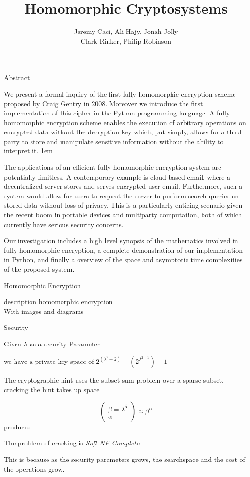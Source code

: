 \documentclass[a0,portrait]{a0poster}
\title{Homomorphic Cryptosystems}
\author{
Jeremy Caci, Ali Hajy, Jonah Jolly\\
Clark Rinker, Philip Robinson
}
\begin{document}
\maketitle



\begin{multicols}{2}
\begin{slide}{Abstract}

We present a formal inquiry of the first fully homomorphic encryption scheme proposed by Craig Gentry in 2008. Moreover we introduce the first implementation of this cipher in the Python programming language. A fully homomorphic encryption scheme enables the execution of arbitrary operations on encrypted data without the decryption key which, put simply, allows for a third party to  store and manipulate sensitive information without the ability to interpret it. 
\parskip 1em

The applications of an efficient fully homomorphic encryption system are potentially limitless. A contemporary example is cloud based email, where a decentralized server stores and serves encrypted user email. Furthermore, such a system would allow for users to request the server to perform search queries on stored data without loss of privacy. This is a particularly enticing scenario given the recent boom in portable devices and multiparty computation, both of which currently have serious security concerns. 

Our investigation includes a high level synopsis of the mathematics involved in fully homomorphic encryption, a complete demonstration of our implementation in Python, and finally a overview of the space and asymptotic time complexities of the proposed system. 

\end{slide}

\begin{slide}{Homomorphic Encryption}
 \centerline{description homomorphic encryption \\ With images and diagrams}

\end{slide}

\begin{slide}{Security}

Given \(\lambda\) as a security Parameter 

we have a private key space of \(2^{(\lambda^2-2)} - (2^{\lambda^{2-1}})-1\)

The cryptographic hint uses the subset sum problem over a sparse subset. cracking the hint takes up space 

\[\left(\begin{matrix}\beta = \lambda^5\\\alpha \end{matrix}\right)\approx \beta^\alpha\] produces


The problem of cracking is {\em Soft NP-Complete}

This is because as the security parameters grows, the searchspace and the cost of the operations grow. 
\end{slide}

\end{multicols}
\end{document}
